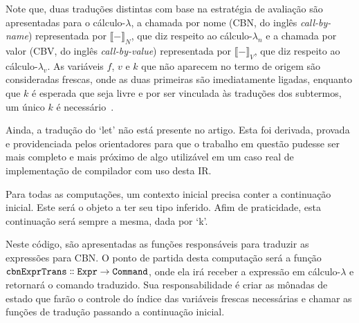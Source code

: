 \phantom{Newline}

\noindent Note que, duas traduções distintas com base na estratégia de avaliação são apresentadas para o cálculo-$\lambda$, a chamada por nome (CBN, do inglês \textit{call-by-name}) representada por ${\llbracket - \rrbracket}_N$, que diz respeito ao cálculo-${\lambda}_n$ e a chamada por valor (CBV, do inglês \textit{call-by-value}) representada por ${\llbracket - \rrbracket}_V$, que diz respeito ao cálculo-${\lambda}_v$.
As variáveis $f$, $v$ e $k$ que não aparecem no termo de origem são consideradas frescas, onde as duas primeiras são imediatamente ligadas, enquanto que $k$ é esperada que seja livre e por ser vinculada às traduções dos subtermos, um único $k$ é necessário~\cite{torrens2024operational}.

Ainda, a tradução do `let' não está presente no artigo. 
Esta foi derivada, provada e providenciada pelos orientadores para que o trabalho em questão pudesse ser mais completo e mais próximo de algo utilizável em um caso real de implementação de compilador com uso desta IR.


Para todas as computações, um contexto inicial precisa conter a continuação inicial.
Este será o objeto a ter seu tipo inferido.
Afim de praticidade, esta continuação será sempre a mesma, dada por `k'.


Neste código, são apresentadas as funções responsáveis para traduzir as expressões para CBN.
O ponto de partida desta computação será a função $\mathtt{cbnExprTrans \dblcolon Expr \to Command}$, onde ela irá receber a expressão em cálculo-$\lambda$ e retornará o comando traduzido.
Sua responsabilidade é criar as mônadas de estado que farão o controle do índice das variáveis frescas necessárias e chamar as funções de tradução passando a continuação inicial.

